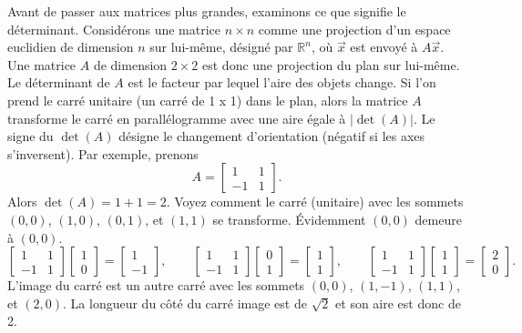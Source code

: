Avant de passer aux matrices plus grandes, examinons ce que signifie le déterminant. Considérons une matrice $n \times n$
comme une projection d’un espace euclidien de dimension $n$ sur lui-même, désigné par ${\mathbb{R}}^n$, où $\vec{x}$ est envoyé à $A \vec{x}$.
Une matrice $A$ de dimension $2 \times 2$ est donc une projection du plan sur lui-même. Le déterminant de 
$A$ est le facteur par lequel l’aire des objets change. Si l'on prend le carré unitaire (un carré de 1 x 1) dans le plan, alors la matrice
$A$ transforme le carré en parallélogramme avec une aire égale à $\lvert\det(A)\rvert$.  Le signe
du $\det(A)$ désigne le changement d'orientation (négatif si les axes s’inversent). Par exemple, prenons
\begin{equation*}
A =
\begin{bmatrix}
1 & 1 \\
-1 & 1
\end{bmatrix} .
\end{equation*}
Alors $\det(A) = 1+1 = 2$.  Voyez comment le carré (unitaire) avec les sommets
$(0,0)$, $(1,0)$, $(0,1)$, et $(1,1)$ se transforme.  Évidemment $(0,0)$ demeure à $(0,0)$.  
\begin{equation*}
\begin{bmatrix}
1 & 1 \\
-1 & 1
\end{bmatrix}
\begin{bmatrix}
1 \\ 0
\end{bmatrix} =
\begin{bmatrix}
1 \\
-1 
\end{bmatrix}
,
\qquad
\begin{bmatrix}
1 & 1 \\
-1 & 1
\end{bmatrix}
\begin{bmatrix}
0 \\ 1
\end{bmatrix} =
\begin{bmatrix}
1 \\
1 
\end{bmatrix}
,
\qquad
\begin{bmatrix}
1 & 1 \\
-1 & 1
\end{bmatrix}
\begin{bmatrix}
1 \\ 1
\end{bmatrix} =
\begin{bmatrix}
2 \\
0 
\end{bmatrix}
.
\end{equation*}
L’image du carré est un autre carré avec les sommets $(0,0)$, $(1,-1)$,
$(1,1)$, et $(2,0)$. La longueur du côté du carré image est de $\sqrt{2}$ et son aire est donc de 2.

